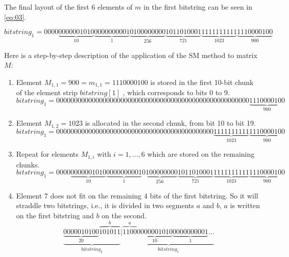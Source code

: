 \documentclass[10pt]{article}
\begin{document}
The final layout of the first 6 elements of $m$ in the first bitstring can be seen in \ref{eq:03}.

\begin{equation}\label{eq:03}
 bitstring_1 = 0000\underbrace{0000001010}_{10}\underbrace{0000000001}_{1}\underbrace{0100000000}_{256}\underbrace{1011010001}_{721}\underbrace{1111111111}_{1023}\underbrace{1110000100}_{900} 
\end{equation}

Here is a step-by-step description of the application of the SM method to matrix $M$:

\begin{enumerate}
 \item Element $M_{1,1}=900 = m_{1,1} = 1110000100$ is stored in the first 10-bit chunk of the element strip $bitstring[1]$ , which corresponds to bits 0 to 9.
\begin{equation*}\label{eq:04}
bitstring_1 = 000000000000000000000000000000000000000000000000000000\underbrace{1110000100}_{900} 
\end{equation*}
 \item Element $M_{1,2}=1023$ is allocated in the second chunk, from bit 10 to bit 19.
\begin{equation*}\label{eq:05}
 bitstring_1 = 00000000000000000000000000000000000000000000\underbrace{1111111111}_{1023}\underbrace{1110000100}_{900} 
\end{equation*}
 \item Repeat for elements $M_{1,i}$ with $i=1,\ldots,6$ which are stored on the remaining chunks.
 \begin{equation*}\label{eq:06}
bitstring_1 = 0000\underbrace{0000001010}_{10}\underbrace{0000000001}_{1}\underbrace{0100000000}_{256}\underbrace{1011010001}_{721}\underbrace{1111111111}_{1023}\underbrace{1110000100}_{900} 
 \end{equation*}
 \item Element 7 does not fit on the remaining 4 bits of the first bitstring. So it will straddle two bitstrings, i.e., it is divided in two segments $a$ and $b$, $a$ is written on the first bitstring and $b$ on the second.
 \begin{equation*}\label{eq:07}
  \underbrace{\underbrace{0000010100}_{20}\overbrace{101011}^{b}}_{bitstring_2}|\underbrace{\overbrace{1100}^{a}\underbrace{0000001010}_{10}\underbrace{0000000001}_{1}\hdots}_{bitstring_1}
\end{equation*}
\end{enumerate}
\end{document}

